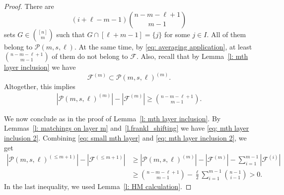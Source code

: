 \documentclass{article}
\begin{document}
\begin{proof}
    There are
    \[
    (i + \ell - m - 1){n - m - \ell +1 \choose m - 1}
    \]
    sets $G \in {[n] \choose m}$ such that
    $
    G \cap [\ell + m - 1] = \{j\}
    $
    for some $j \in I$. All of them belong to $\mathcal{P}(m, s, \ell)$. At the same time, by \eqref{eq: averaging application}, at least
    $
    {n - m - \ell + 1 \choose m - 1}
    $
    of them do not belong to $\mathcal{F}$. Also, recall that by Lemma~\ref{l: mth layer inclusion} we have
    \[
    \mathcal{F}^{(m)} \subset \mathcal{P}(m, s, \ell)^{(m)}.
    \]
    Altogether, this implies
    \begin{align} \label{eq: small mth layer}
        |\mathcal{P}(m, s, \ell)^{(m)}| - |\mathcal{F}^{(m)}| \geq {n - m - \ell + 1 \choose m - 1}.
    \end{align}

    We now conclude as in the proof of Lemma~\ref{l: mth layer inclusion}. By Lemmas~\ref{l: matchings on layer m} and~\ref{l.frankl_shifting} we have \eqref{eq: mth layer inclusion 2}. Combining \eqref{eq: small mth layer} and \eqref{eq: mth layer inclusion 2}, we get
    \begin{align*}
        |\mathcal{P}(m, s, \ell)^{(\leq m+1)}| - |\mathcal{F}^{(\leq m+1)}|
        &\geq |\mathcal{P}(m, s, \ell)^{(m)}| - |\mathcal{F}^{(m)}| - \sum_{i=1}^{m-1}|\mathcal{F}^{(i)}| \\
        &\geq {n - m - \ell + 1 \choose m - 1} - \frac{\ell}{2}\sum_{i=1}^{m-1} {n - 1 \choose i - 1} > 0.
    \end{align*}
    In the last inequality, we used Lemma~\ref{l: HM calculation}.
\end{proof}
\end{document}
